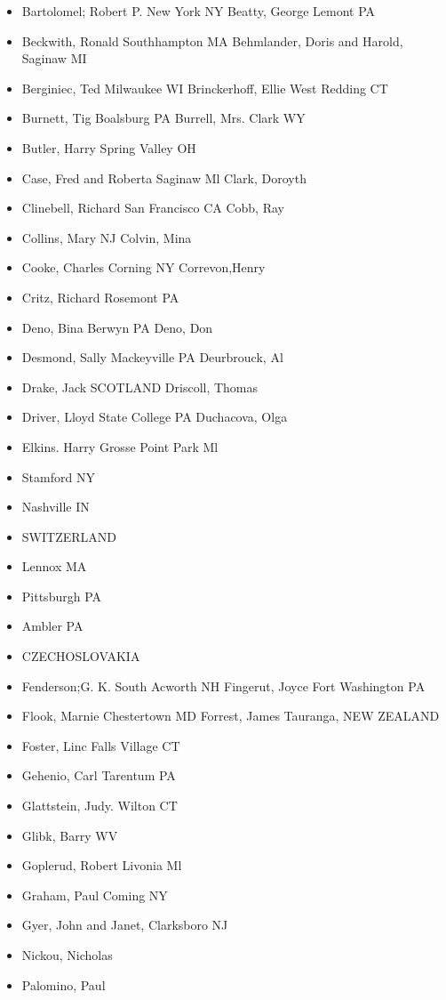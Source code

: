 \begin{itemize}
\item Bartolomel; Robert P. New York NY Beatty, George Lemont PA
\item Beckwith, Ronald Southhampton MA Behmlander, Doris and Harold, Saginaw MI
\item Berginiec, Ted Milwaukee WI Brinckerhoff, Ellie West Redding CT
\item Burnett, Tig Boalsburg PA Burrell, Mrs. Clark WY
\item Butler, Harry Spring Valley OH
\item Case, Fred and Roberta Saginaw Ml Clark, Doroyth
\item Clinebell, Richard San Francisco CA Cobb, Ray
\item Collins, Mary NJ Colvin, Mina
\item Cooke, Charles Corning NY Correvon,Henry
\item Critz, Richard Rosemont PA
\item Deno, Bina Berwyn PA Deno, Don
\item Desmond, Sally Mackeyville PA Deurbrouck, Al
\item Drake, Jack SCOTLAND Driscoll, Thomas
\item Driver, Lloyd State College PA Duchacova, Olga
\item Elkins. Harry Grosse Point Park Ml
\item Stamford NY
\item Nashville IN
\item SWITZERLAND
\item Lennox MA
\item Pittsburgh PA
\item Ambler PA
\item CZECHOSLOVAKIA
\item Fenderson;G. K. South Acworth NH Fingerut, Joyce Fort Washington PA
\item Flook, Marnie Chestertown MD Forrest, James Tauranga, NEW ZEALAND
\item Foster, Linc Falls Village CT
\item Gehenio, Carl Tarentum PA
\item Glattstein, Judy. Wilton CT
\item Glibk, Barry WV
\item Goplerud, Robert Livonia Ml
\item Graham, Paul Coming NY
\item Gyer, John and Janet, Clarksboro NJ
\item Nickou, Nicholas
\item Palomino, Paul

\end{itemize}
